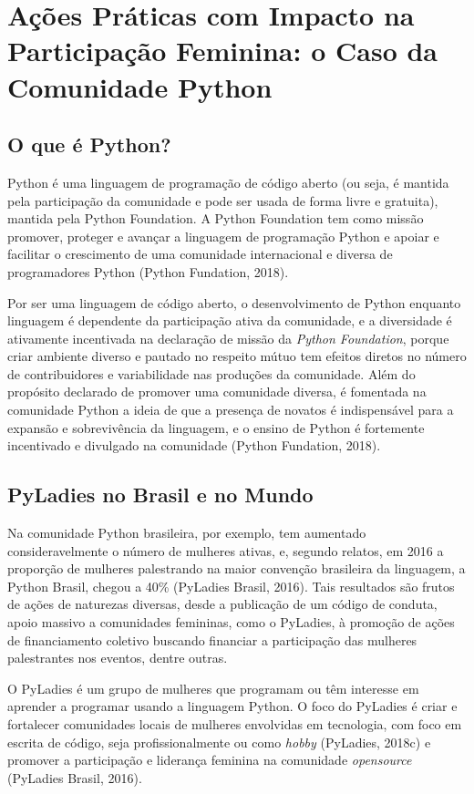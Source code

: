 \section*{Ações Práticas com Impacto na Participação Feminina: o Caso da Comunidade Python}
\subsection*{O que é Python?}

Python é uma linguagem de programação de código aberto (ou seja, é mantida pela participação da comunidade e pode ser usada de forma livre e gratuita), mantida pela Python Foundation. A Python Foundation tem como missão promover, proteger e avançar a linguagem de programação Python e apoiar e facilitar o crescimento de uma comunidade internacional e diversa de programadores Python (Python Fundation, 2018).

Por ser uma linguagem de código aberto, o desenvolvimento de Python enquanto linguagem é dependente da participação ativa da comunidade, e a diversidade é ativamente incentivada na declaração de missão da \textit{Python Foundation}, porque criar ambiente diverso e pautado no respeito mútuo tem efeitos diretos no número de contribuidores e variabilidade nas produções da comunidade. Além do propósito declarado de promover uma comunidade diversa, é fomentada na comunidade Python a ideia de que a presença de novatos é indispensável para a expansão e sobrevivência da linguagem, e o ensino de Python é fortemente incentivado e divulgado na comunidade (Python Fundation, 2018).

\subsection*{PyLadies no Brasil e no Mundo}

Na comunidade Python brasileira, por exemplo, tem aumentado consideravelmente o número de mulheres ativas, e, segundo relatos, em 2016 a proporção de mulheres palestrando na maior convenção brasileira da linguagem, a Python Brasil, chegou a 40\% (PyLadies Brasil, 2016). Tais resultados são frutos de ações de naturezas diversas, desde a publicação de um código de conduta, apoio massivo a comunidades femininas, como o PyLadies, à promoção de ações de financiamento coletivo buscando financiar a participação das mulheres palestrantes nos eventos, dentre outras.

O PyLadies é um grupo de mulheres que programam ou têm interesse em aprender a programar usando a linguagem Python. O foco do PyLadies é criar e fortalecer comunidades locais de mulheres envolvidas em tecnologia, com foco em escrita de código, seja profissionalmente ou como \textit{hobby} (PyLadies, 2018c) e promover a participação e liderança feminina na comunidade \textit{opensource} (PyLadies Brasil, 2016).

